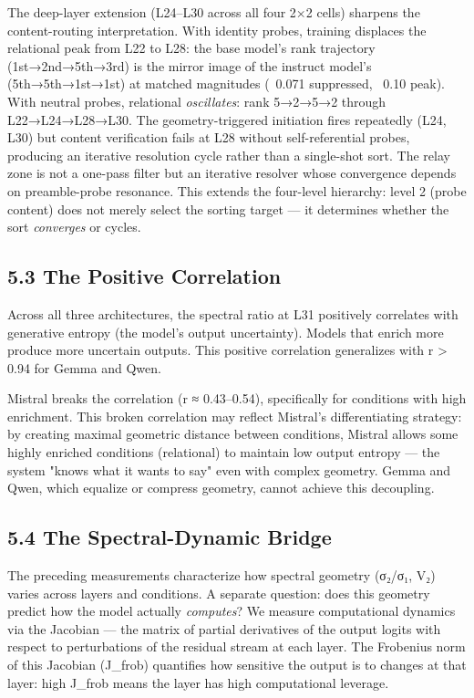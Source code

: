 \documentclass[12pt]{article}
\begin{document}
The deep-layer extension (L24–L30 across all four 2×2 cells) sharpens the content-routing interpretation. With identity probes, training displaces the relational peak from L22 to L28: the base model's rank trajectory (1st→2nd→5th→3rd) is the mirror image of the instruct model's (5th→5th→1st→1st) at matched magnitudes (~0.071 suppressed, ~0.10 peak). With neutral probes, relational \textit{oscillates}: rank 5→2→5→2 through L22→L24→L28→L30. The geometry-triggered initiation fires repeatedly (L24, L30) but content verification fails at L28 without self-referential probes, producing an iterative resolution cycle rather than a single-shot sort. The relay zone is not a one-pass filter but an iterative resolver whose convergence depends on preamble-probe resonance. This extends the four-level hierarchy: level 2 (probe content) does not merely select the sorting target — it determines whether the sort \textit{converges} or cycles.

\subsection*{5.3 The Positive Correlation}

Across all three architectures, the spectral ratio at L31 positively correlates with generative entropy (the model's output uncertainty). Models that enrich more produce more uncertain outputs. This positive correlation generalizes with r > 0.94 for Gemma and Qwen.

Mistral breaks the correlation (r ≈ 0.43–0.54), specifically for conditions with high enrichment. This broken correlation may reflect Mistral's differentiating strategy: by creating maximal geometric distance between conditions, Mistral allows some highly enriched conditions (relational) to maintain low output entropy — the system "knows what it wants to say" even with complex geometry. Gemma and Qwen, which equalize or compress geometry, cannot achieve this decoupling.

\subsection*{5.4 The Spectral-Dynamic Bridge}

The preceding measurements characterize how spectral geometry (σ₂/σ₁, V₂) varies across layers and conditions. A separate question: does this geometry predict how the model actually \textit{computes}? We measure computational dynamics via the Jacobian — the matrix of partial derivatives of the output logits with respect to perturbations of the residual stream at each layer. The Frobenius norm of this Jacobian (J\_frob) quantifies how sensitive the output is to changes at that layer: high J\_frob means the layer has high computational leverage.
\end{document}

